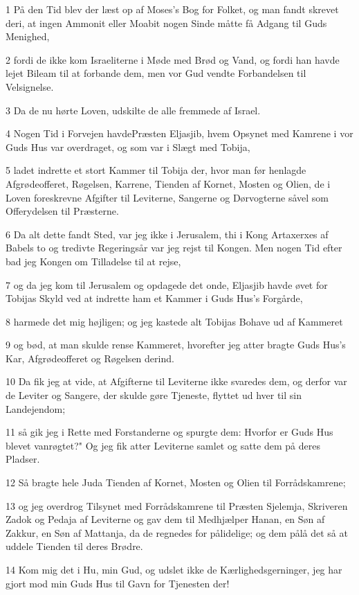 \par 1 På den Tid blev der læst op af Moses's Bog for Folket, og man fandt skrevet deri, at ingen Ammonit eller Moabit nogen Sinde måtte få Adgang til Guds Menighed,
\par 2 fordi de ikke kom Israeliterne i Møde med Brød og Vand, og fordi han havde lejet Bileam til at forbande dem, men vor Gud vendte Forbandelsen til Velsignelse.
\par 3 Da de nu hørte Loven, udskilte de alle fremmede af Israel.
\par 4 Nogen Tid i Forvejen havdePræsten Eljasjib, hvem Opsynet med Kamrene i vor Guds Hus var overdraget, og som var i Slægt med Tobija,
\par 5 ladet indrette et stort Kammer til Tobija der, hvor man før henlagde Afgrødeofferet, Røgelsen, Karrene, Tienden af Kornet, Mosten og Olien, de i Loven foreskrevne Afgifter til Leviterne, Sangerne og Dørvogterne såvel som Offerydelsen til Præsterne.
\par 6 Da alt dette fandt Sted, var jeg ikke i Jerusalem, thi i Kong Artaxerxes af Babels to og tredivte Regeringsår var jeg rejst til Kongen. Men nogen Tid efter bad jeg Kongen om Tilladelse til at rejse,
\par 7 og da jeg kom til Jerusalem og opdagede det onde, Eljasjib havde øvet for Tobijas Skyld ved at indrette ham et Kammer i Guds Hus's Forgårde,
\par 8 harmede det mig højligen; og jeg kastede alt Tobijas Bohave ud af Kammeret
\par 9 og bød, at man skulde rense Kammeret, hvorefter jeg atter bragte Guds Hus's Kar, Afgrødeofferet og Røgelsen derind.
\par 10 Da fik jeg at vide, at Afgifterne til Leviterne ikke svaredes dem, og derfor var de Leviter og Sangere, der skulde gøre Tjeneste, flyttet ud hver til sin Landejendom;
\par 11 så gik jeg i Rette med Forstanderne og spurgte dem: Hvorfor er Guds Hus blevet vanrøgtet?" Og jeg fik atter Leviterne samlet og satte dem på deres Pladser.
\par 12 Så bragte hele Juda Tienden af Kornet, Mosten og Olien til Forrådskamrene;
\par 13 og jeg overdrog Tilsynet med Forrådskamrene til Præsten Sjelemja, Skriveren Zadok og Pedaja af Leviterne og gav dem til Medhjælper Hanan, en Søn af Zakkur, en Søn af Mattanja, da de regnedes for pålidelige; og dem pålå det så at uddele Tienden til deres Brødre.
\par 14 Kom mig det i Hu, min Gud, og udslet ikke de Kærlighedsgerninger, jeg har gjort mod min Guds Hus til Gavn for Tjenesten der!
